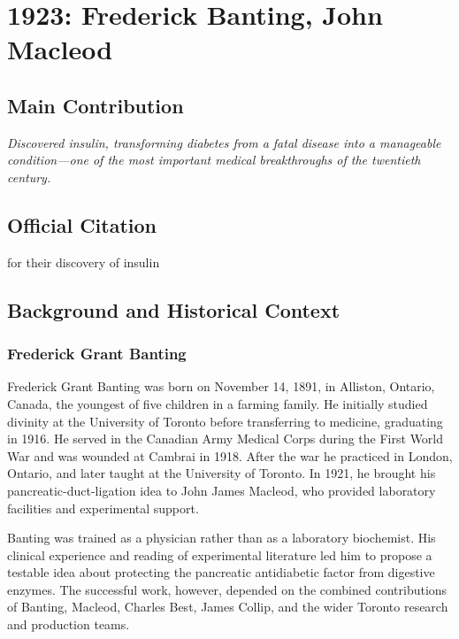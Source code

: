 \chapter[1923 --- Banting et al.]{1923: Frederick Banting, John Macleod}
\label{ch:1923_Banting}

\section*{Main Contribution}

\textit{Discovered insulin, transforming diabetes from a fatal disease into a manageable condition---one of the most important medical breakthroughs of the twentieth century.}\cite{nobel-1923,lecture-1923}

\section{Official Citation}

for their discovery of insulin

\section{Background and Historical Context}

\subsection{Frederick Grant Banting}

Frederick Grant Banting was born on November 14, 1891, in Alliston, Ontario, Canada, the youngest of five children in a farming family. He initially studied divinity at the University of Toronto before transferring to medicine, graduating in 1916. He served in the Canadian Army Medical Corps during the First World War and was wounded at Cambrai in 1918. After the war he practiced in London, Ontario, and later taught at the University of Toronto. In 1921, he brought his pancreatic-duct-ligation idea to John James Macleod, who provided laboratory facilities and experimental support.\cite{banting-biographical}

Banting was trained as a physician rather than as a laboratory biochemist. His clinical experience and reading of experimental literature led him to propose a testable idea about protecting the pancreatic antidiabetic factor from digestive enzymes. The successful work, however, depended on the combined contributions of Banting, Macleod, Charles Best, James Collip, and the wider Toronto research and production teams.

